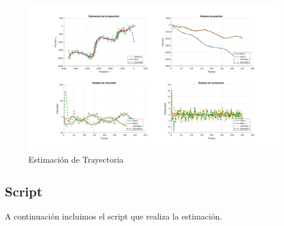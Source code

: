 	\begin{figure}[H]
		\centering
		\includegraphics[width=1.0\textwidth,keepaspectratio]{Figuras/graf_ej5.pdf}
		\caption{Estimación de Trayectoria}
		\label{fig:ej6_cov}
	\end{figure}
	
	
	\subsection{Script}

	A continuación incluimos el script que realiza la estimación.
	

